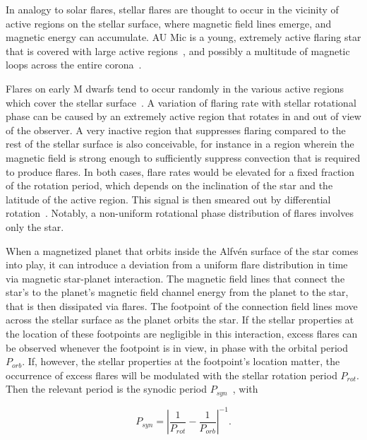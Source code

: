 \documentclass[fleqn,usenatbib,letters]{mnras}%
\begin{document}
In analogy to solar flares, stellar flares are thought to occur in the vicinity of active regions on the stellar surface, where magnetic field lines emerge, and magnetic energy can accumulate. AU Mic is a young, extremely active flaring star that is covered with large active regions~\citep{linsky1994, kochukhov2020, plavchan2020}, and possibly a multitude of magnetic loops across the entire corona~\citep{cranmer2013}.



Flares on early M dwarfs tend to occur randomly in the various active regions which cover the stellar surface~\citep{doyle2018, doyle2019}. A variation of flaring rate with stellar rotational phase can be caused by an extremely active region that rotates in and out of view of the observer. A very inactive region that suppresses flaring compared to the rest of the stellar surface is also conceivable, for instance in a region wherein the magnetic field is strong enough to sufficiently suppress convection that is required to produce flares. In both cases, flare rates would be elevated for a fixed fraction of the rotation period, which depends on the inclination of the star and the latitude of the active region. This signal is then smeared out by differential rotation~\citep{howard2021evryflare}. Notably, a non-uniform rotational phase distribution of flares involves only the star. 

When a magnetized planet that orbits inside the Alfv\'en surface of the star comes into play, it can introduce a deviation from a uniform flare distribution in time via magnetic star-planet interaction. The magnetic field lines that connect the star's to the planet's magnetic field channel energy from the planet to the star, that is then dissipated via flares. The footpoint of the connection field lines move across the stellar surface as the planet orbits the star. If the stellar properties at the location of these footpoints are negligible in this interaction, excess flares can be observed whenever the footpoint is in view, in phase with the orbital period $P_{orb}$. If, however, the stellar properties at the footpoint's location matter, the occurrence of excess flares will be modulated with the stellar rotation period $P_{rot}$. Then the relevant period is the synodic period $P_{syn}$~\citep{fischer2019}, with

\begin{equation}
P_{syn} = \left|\dfrac{1}{P_{rot}} - \dfrac{1}{P_{orb}}\right|^{-1}.
\end{equation}
\end{document}
